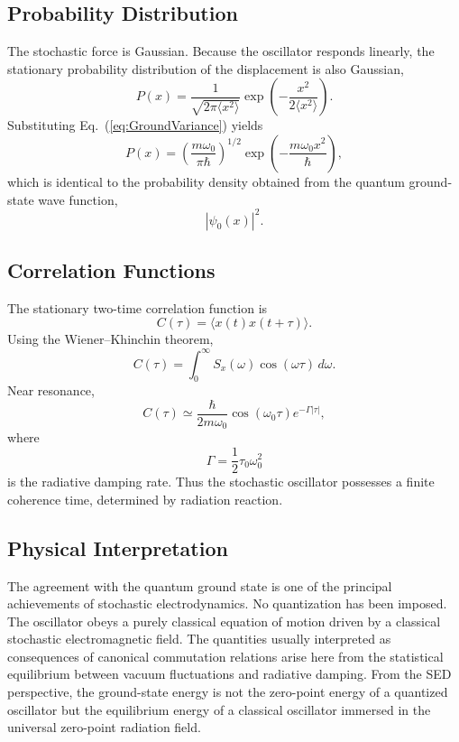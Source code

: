 \subsection{Probability Distribution}
The stochastic force is Gaussian.
Because the oscillator responds linearly, the stationary probability
distribution of the displacement is also Gaussian,
\begin{equation}
P(x)=\frac1{\sqrt{2\pi\langle x^2\rangle}}
\exp\left(-\frac{x^2}{2\langle x^2\rangle}\right).
\end{equation}
Substituting Eq.~(\ref{eq:GroundVariance}) yields
\begin{equation}
\boxed{P(x)=\left(\frac{m\omega_0}{\pi\hbar}\right)^{1/2}
\exp\left(-\frac{m\omega_0x^2}{\hbar}\right),}
\label{eq:GaussianSED}
\end{equation}
which is identical to the probability density obtained from the quantum
ground-state wave function,
\[|\psi_0(x)|^2.\]
\subsection{Correlation Functions}
The stationary two-time correlation function is
\begin{equation}
C(\tau)=\langle x(t)x(t+\tau)\rangle .
\end{equation}
Using the Wiener--Khinchin theorem,
\begin{equation}
C(\tau)=\int_0^\infty S_x(\omega)\cos(\omega\tau)\,d\omega.
\end{equation}
Near resonance,
\begin{equation}
C(\tau)\simeq\frac{\hbar}{2m\omega_0}\cos(\omega_0\tau)e^{-\Gamma|\tau|},
\end{equation}
where
\[\Gamma=\frac12\tau_0\omega_0^2\]
is the radiative damping rate.
Thus the stochastic oscillator possesses a finite coherence time,
determined by radiation reaction.
\subsection{Physical Interpretation}
The agreement with the quantum ground state is one of the principal
achievements of stochastic electrodynamics.
No quantization has been imposed.
The oscillator obeys a purely classical equation of motion driven by a
classical stochastic electromagnetic field.
The quantities usually interpreted as consequences of canonical
commutation relations arise here from the statistical equilibrium
between vacuum fluctuations and radiative damping.
From the SED perspective, the ground-state energy is not the zero-point
energy of a quantized oscillator but the equilibrium energy of a
classical oscillator immersed in the universal zero-point radiation
field.
